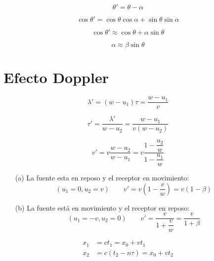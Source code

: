 \documentclass[../main]{subfiles}
\begin{document}
\begin{equation*}
    \theta'=\theta-\alpha
\end{equation*}

\begin{equation*}
    \cos{\theta'}=\cos{\theta}\cos{\alpha}+\sin{\theta}\sin{\alpha}
\end{equation*}

\begin{equation*}
    \cos{\theta'}\approx \cos{\theta}+\alpha \sin{\theta}
\end{equation*}

\begin{equation*}
    \alpha \approx \beta \sin{\theta}
\end{equation*}

\section{Efecto Doppler}

\begin{equation*}
    \lambda '=(w-u_1)\tau=\dfrac{w-u_1}{v}
\end{equation*}

\begin{equation*}
    \tau '=\dfrac{\lambda '}{w-u_2}=\dfrac{w-u_1}{v(w-u_2)}
\end{equation*}

\begin{equation}
    v'=v \dfrac{w-u_2}{w-u_1}=v\dfrac{1-\dfrac{u_2}{w}}{1-\dfrac{u_1}{w}}
\end{equation}

\begin{itemize}
    \item[(a)] La fuente esta en reposo y el receptor en movimiento:
        \begin{equation}
            (u_1=0, u_2=v) \qquad v'=v\left(1 - \dfrac{v}{w}\right)=v(1-\beta)
        \end{equation}
    \item[(b)] La fuente está en movimiento y el receptor en reposo:
        \begin{equation}
            (u_1=-v, u_2=0) \qquad v'=\dfrac{v}{1+\dfrac{v}{w}}=\dfrac{v}{1+\beta}
        \end{equation}
\end{itemize}

\begin{align*}
    x_1&=ct_1=x_0+vt_1 \\
    x_2&=c(t_2-n \tau)=x_0+vt_2
\end{align*}
\end{document}
